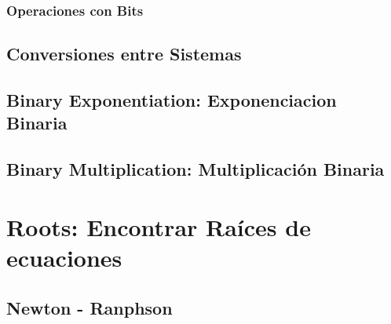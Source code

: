 \documentclass[12pt, fleqn]{report}                             %
\theoremstyle{break}                                            %
\begin{document}
            \subsection{Operaciones con Bits}

        \section{Conversiones entre Sistemas}

        \section{Binary Exponentiation: Exponenciacion Binaria}

        \section{Binary Multiplication: Multiplicación Binaria}



    \clearpage
    \chapter{Roots: Encontrar Raíces de ecuaciones}

        \section{Newton - Ranphson}
\end{document}
